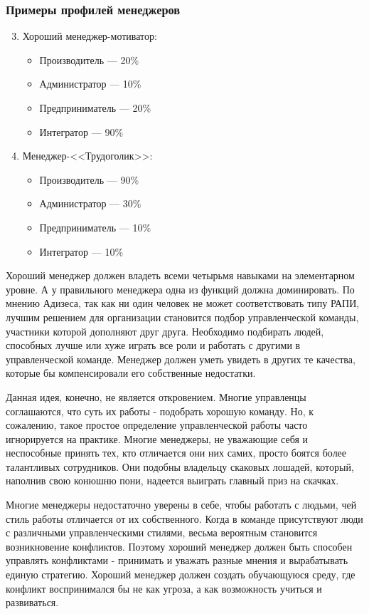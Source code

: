 \documentclass{../industrial-development}
\begin{document}
{\begin{frame} \frametitle{Примеры профилей менеджеров }
	\begin{enumerate}
\setcounter{enumi}{2}
\item Хороший менеджер-мотиватор:
		 \begin{itemize}
                     \item Производитель — 20\%
 		 \item Администратор — 10\%
 		 \item Предприниматель — 20\%
		\item Интегратор — 90\%
		\end{itemize} 
\item Менеджер-<<Трудоголик>>:	
		 \begin{itemize}
                         \item Производитель — 90\%
 		 \item Администратор — 30\%
 		 \item Предприниматель — 10\%
		\item Интегратор — 10\%
		\end{itemize} 
\end{enumerate}
\end{frame}
\lecturenotes
Хороший менеджер должен владеть всеми четырьмя навыками на элементарном уровне. А у правильного менеджера одна из функций должна доминировать.
По мнению Адизеса, так как ни один человек не может соответствовать типу РАПИ, лучшим решением для организации становится подбор управленческой команды, участники которой дополняют друг друга. Необходимо подбирать людей, способных лучше или хуже играть все роли и работать с другими в управленческой команде. Менеджер должен уметь увидеть в других те качества, которые бы компенсировали его собственные недостатки.

Данная идея, конечно, не является откровением. Многие управленцы соглашаются, что суть их работы - подобрать хорошую команду. Но, к сожалению, такое простое определение управленческой работы часто игнорируется на практике. Многие менеджеры, не уважающие себя и неспособные принять тех, кто отличается они них самих, просто боятся более талантливых сотрудников. Они подобны владельцу скаковых лошадей, который, наполнив свою конюшню пони, надеется выиграть главный приз на скачках.

Многие менеджеры недостаточно уверены в себе, чтобы работать с людьми, чей стиль работы отличается от их собственного. Когда в команде присутствуют люди с различными управленческими стилями, весьма вероятным становится возникновение конфликтов. Поэтому хороший менеджер должен быть способен управлять конфликтами - принимать и уважать разные мнения и вырабатывать единую стратегию. Хороший менеджер должен создать обучающуюся среду, где конфликт воспринимался бы не как угроза, а как возможность учиться и развиваться.

}
\end{document}
